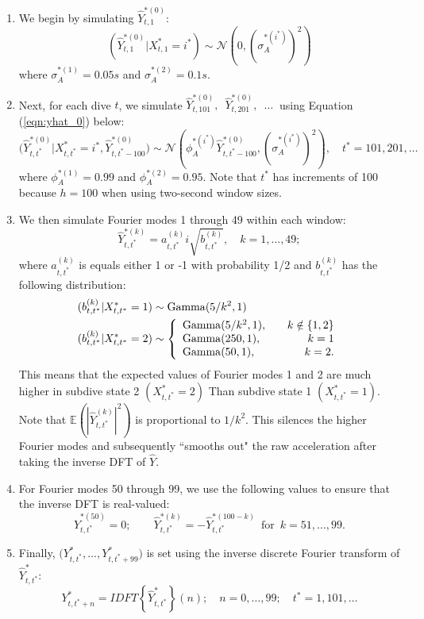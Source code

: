 \begin{enumerate}
    \item We begin by simulating $\hat{Y}^{*(0)}_{t,1}$:
    $$
    	(\hat{Y}^{*(0)}_{t,1}|X^*_{t,1} = i^*) \sim \mathcal{N} \left(0, \left(\sigma_A^{*(i^*)}\right)^2 \right)
    $$
    where $\sigma_A^{*(1)} = 0.05s$ and $\sigma_A^{*(2)} = 0.1s$. 
    \item Next, for each dive $t$, we simulate $\hat{Y}^{*(0)}_{t,101},\enspace \hat{Y}^{*(0)}_{t,201}, \enspace \ldots ~ $ using Equation (\ref{eqn:yhat_0}) below:
    \begin{equation}	
        \Big(\hat{Y}^{*(0)}_{t,t^*}|X^*_{t,t^*} = i^*,\hat{Y}^{*(0)}_{t,t^*-100}\Big) \sim \mathcal{N} \left(\phi_A^{*(i^*)} \hat{Y}^{*(0)}_{t,t^*-100}, \left(\sigma_A^{*(i^*)}\right)^2 \right), \quad t^* = 101,201,\ldots
    	\label{eqn:yhat_0}
    \end{equation}
    where $\phi_A^{*(1)} = 0.99$ and $\phi_A^{*(2)} = 0.95$. Note that $t^*$ has increments of 100 because $h=100$ when using two-second window sizes.
    \item We then simulate Fourier modes 1 through 49 within each window:
    $$
    	\hat{Y}^{*(k)}_{t,t^*} = a_{t,t^*}^{(k)} i\sqrt{b^{(k)}_{t,t^*}}, \quad k = 1,\ldots,49;
    $$
    where $a^{(k)}_{t,t^*}$ is equals either 1 or -1 with probability 1/2 and $b^{(k)}_{t,t^*}$ has the following distribution:
    \begin{align}
    \begin{split}
    	(b^{(k)}_{t,t^*}|X^*_{t,t^*} = 1) &\sim {\rm{Gamma}}(5/k^2, 1) \\
    	(b^{(k)}_{t,t^*}|X^*_{t,t^*} = 2) &\sim \left\{\begin{array}{lr}
    	{\rm{Gamma}}(5/k^2, 1), \quad & k \notin \{1,2\} \\
    	{\rm{Gamma}}(250,1), & k = 1 \\
    	{\rm{Gamma}}(50,1), & k = 2.
    	\end{array}\right. 
    \end{split}
    \end{align}
    This means that the expected values of Fourier modes 1 and 2 are much higher in subdive state 2 $(X^*_{t,t^*} = 2)$ Than subdive state 1 $(X^*_{t,t^*} = 1)$. Note that $\mathbb{E}\left(|\hat{Y}^{(k)}_{t,t^*}|^2\right)$ is proportional to $1/k^2$. This silences the higher Fourier modes and subsequently ``smooths out" the raw acceleration after taking the inverse DFT of $\hat Y$. 
    \item For Fourier modes 50 through 99, we use the following values to ensure that the inverse DFT is real-valued:
    $$
    \hat{Y}^{*(50)}_{t,t^*} = 0; \qquad
	\hat{Y}^{*(k)}_{t,t^*} = -\hat{Y}^{*(100-k)}_{t,t^*} \enspace \text{for} \enspace k = 51,\ldots,99.
    $$
    \item Finally, $\Big(Y^*_{t,t^*},\ldots,Y^*_{t,t^*+99}\Big)$ is set using the inverse discrete Fourier transform of $\hat{Y}^*_{t,t^*}$:
    $$Y^*_{t,t^*+n} = IDFT\left\{\hat{Y}^*_{t,t^*}\right\}(n); \quad n = 0,\ldots,99; \quad t^* = 1,101,\ldots$$
\end{enumerate}
